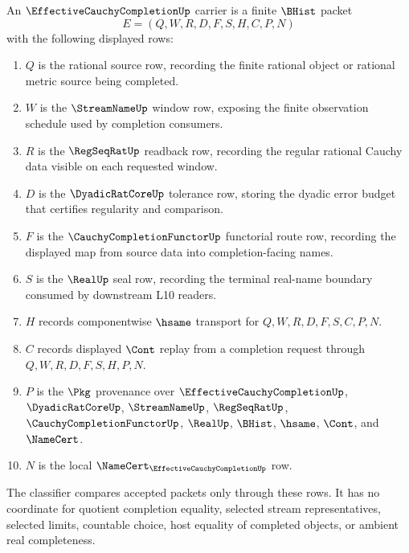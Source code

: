 \begin{definition}\label{def:effective-cauchy-completion-carrier}
An $\EffectiveCauchyCompletionUp$ carrier is a finite $\BHist$ packet
$$
E=(Q,W,R,D,F,S,H,C,P,N)
$$
with the following displayed rows:
\begin{enumerate}
\item $Q$ is the rational source row, recording the finite rational object or rational metric source being completed.
\item $W$ is the $\StreamNameUp$ window row, exposing the finite observation schedule used by completion consumers.
\item $R$ is the $\RegSeqRatUp$ readback row, recording the regular rational Cauchy data visible on each requested window.
\item $D$ is the $\DyadicRatCoreUp$ tolerance row, storing the dyadic error budget that certifies regularity and comparison.
\item $F$ is the $\CauchyCompletionFunctorUp$ functorial route row, recording the displayed map from source data into completion-facing names.
\item $S$ is the $\RealUp$ seal row, recording the terminal real-name boundary consumed by downstream L10 readers.
\item $H$ records componentwise $\hsame$ transport for $Q,W,R,D,F,S,C,P,N$.
\item $C$ records displayed $\Cont$ replay from a completion request through $Q,W,R,D,F,S,H,P,N$.
\item $P$ is the $\Pkg$ provenance over $\EffectiveCauchyCompletionUp$, $\DyadicRatCoreUp$, $\StreamNameUp$, $\RegSeqRatUp$, $\CauchyCompletionFunctorUp$, $\RealUp$, $\BHist$, $\hsame$, $\Cont$, and $\NameCert$.
\item $N$ is the local $\NameCert_{\EffectiveCauchyCompletionUp}$ row.
\end{enumerate}
The classifier compares accepted packets only through these rows. It has no coordinate for quotient completion equality, selected stream representatives, selected limits, countable choice, host equality of completed objects, or ambient real completeness.
\end{definition}

